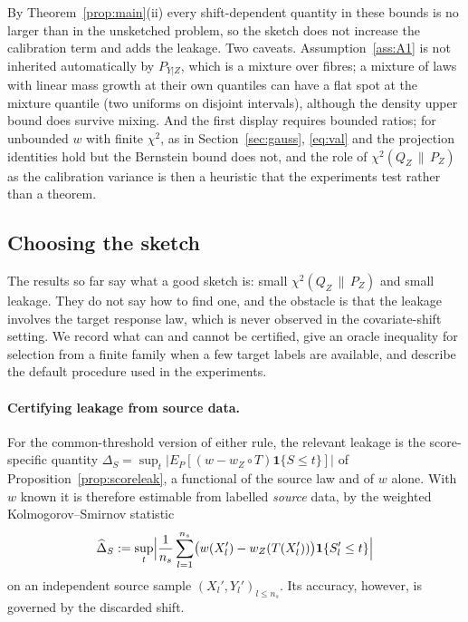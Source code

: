 \documentclass[11pt,a4paper]{article}
\newcommand{\chisqZ}{\chi^2(Q_Z\,\|\,P_Z)}
\newcommand{\ind}{\mathbf 1}
\theoremstyle{plain}
\theoremstyle{definition}
\theoremstyle{remark}
\begin{document}
By Theorem~\ref{prop:main}(ii) every shift-dependent quantity in these bounds is no larger than in the unsketched problem, so the sketch does not increase the calibration term and adds the leakage. Two caveats. Assumption~\ref{ass:A1} is not inherited automatically by $P_{Y|Z}$, which is a mixture over fibres; a mixture of laws with linear mass growth at their own quantiles can have a flat spot at the mixture quantile (two uniforms on disjoint intervals), although the density upper bound does survive mixing. And the first display requires bounded ratios; for unbounded $w$ with finite $\chi^2$, as in Section~\ref{sec:gauss}, \eqref{eq:val} and the projection identities hold but the Bernstein bound does not, and the role of $\chisqZ$ as the calibration variance is then a heuristic that the experiments test rather than a theorem.

\subsection{Choosing the sketch}\label{sec:choose}

The results so far say what a good sketch is: small $\chisqZ$ and small leakage. They do not say how to find one, and the obstacle is that the leakage involves the target response law, which is never observed in the covariate-shift setting. We record what can and cannot be certified, give an oracle inequality for selection from a finite family when a few target labels are available, and describe the default procedure used in the experiments.

\paragraph{Certifying leakage from source data.}
For the common-threshold version of either rule, the relevant leakage is the score-specific quantity $\Delta_S=\sup_t|E_P[(w-w_Z\circ T)\ind\{S\le t\}]|$ of Proposition~\ref{prop:scoreleak}, a functional of the source law and of $w$ alone. With $w$ known it is therefore estimable from labelled \emph{source} data, by the weighted Kolmogorov--Smirnov statistic
\[
\widehat\Delta_S:=\sup_t\Bigl|\frac1{n_s}\sum_{l=1}^{n_s}\bigl(w(X_l')-w_Z(T(X_l'))\bigr)\ind\{S_l'\le t\}\Bigr|
\]
on an independent source sample $(X_l',Y_l')_{l\le n_s}$. Its accuracy, however, is governed by the discarded shift.
\end{document}
